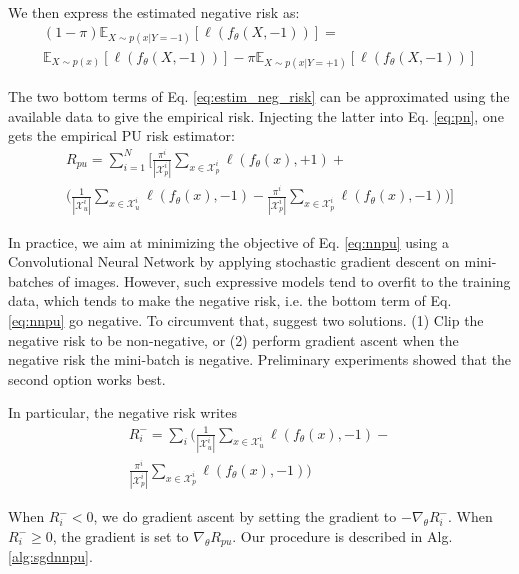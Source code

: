 We then express the estimated negative risk as:
\begin{multline}
  \label{eq:estim_neg_risk}
   (1-\pi) \mathbb{E}_{X \sim p(x|Y=-1)}\left[\ell(f_\theta(X,-1)) \right] = \\
    \mathbb{E}_{X \sim p(x)}\left[\ell(f_\theta(X,-1)) \right]
    - \pi \mathbb{E}_{X \sim p(x|Y=+1)}\left[\ell(f_\theta(X,-1)) \right]
\end{multline}

The two bottom terms of Eq. \ref{eq:estim_neg_risk} can be approximated using the available data to give the empirical risk.
Injecting the latter into Eq. \ref{eq:pn}, one gets the empirical PU risk estimator:
\begin{multline}
  \label{eq:nnpu}
R_{pu}=\sum_{i=1}^{N}\Biggl[ \frac{\pi^{i}}{|\mathcal{X}^{i}_{p}|}\sum_{x \in \mathcal{X}^{i}_p}\ell(f_{\theta}(x),+1) + \\
\Biggl( \frac{1}{|\mathcal{X}^{i}_{u}|}\sum_{x \in \mathcal{X}^{i}_u}\ell(f_{\theta}(x),-1) -
\frac{\pi^{i}}{|\mathcal{X}^{i}_{p}|}\sum_{x \in \mathcal{X}^{i}_p}\ell(f_{\theta}(x),-1) \Biggr) \Biggr]
\end{multline}

In practice, we aim at minimizing the objective of Eq. \ref{eq:nnpu} using a Convolutional Neural Network by applying stochastic gradient descent on mini-batches of images.
However, such expressive models tend to overfit to the training data, which tends to make the negative risk, i.e. the bottom term of Eq. \ref{eq:nnpu} go negative.
To circumvent that, \cite{kiryo17} suggest two solutions.
(1) Clip the negative risk to be non-negative, or (2) perform gradient ascent when the negative risk the mini-batch is negative.
Preliminary experiments showed that the second option works best.

In particular, the negative risk writes
\begin{multline}
  \label{eq:neg_risk}
R_{i}^{-}=\sum_{i}\Biggl(
 \frac{1}{|\mathcal{X}^{i}_{u}|}\sum_{x \in \mathcal{X}^{i}_u}\ell(f_{\theta}(x),-1) - \\
\frac{\pi^{i}}{|\mathcal{X}^{i}_{p}|}\sum_{x \in \mathcal{X}^{i}_p}\ell(f_{\theta}(x),-1) \Biggr)
\end{multline}

When \(R_{i}^{-} < 0\), we do gradient ascent by setting the gradient to \(-\nabla_\theta R_{i}^{-}\).
When \(R_{i}^{-} \geq 0\), the gradient is set to \(\nabla_\theta R_{pu}\).
Our procedure is described in Alg. \ref{alg:sgdnnpu}.

